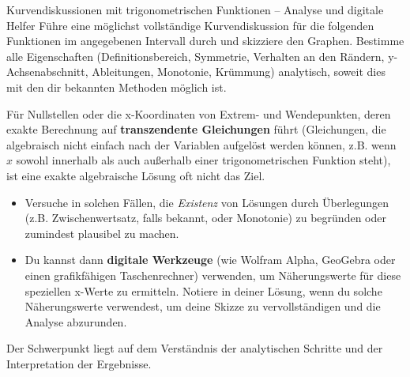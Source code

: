 \begin{aufgabenumgebung}{Kurvendiskussionen mit trigonometrischen Funktionen – Analyse und digitale Helfer}
Führe eine möglichst vollständige Kurvendiskussion für die folgenden Funktionen im angegebenen Intervall durch und skizziere den Graphen. Bestimme alle Eigenschaften (Definitionsbereich, Symmetrie, Verhalten an den Rändern, y-Achsenabschnitt, Ableitungen, Monotonie, Krümmung) analytisch, soweit dies mit den dir bekannten Methoden möglich ist. 

Für Nullstellen oder die x-Koordinaten von Extrem- und Wendepunkten, deren exakte Berechnung auf \textbf{transzendente Gleichungen} führt (Gleichungen, die algebraisch nicht einfach nach der Variablen aufgelöst werden können, z.B. wenn $x$ sowohl innerhalb als auch außerhalb einer trigonometrischen Funktion steht), ist eine exakte algebraische Lösung oft nicht das Ziel.
\begin{itemize}
    \item Versuche in solchen Fällen, die \textit{Existenz} von Lösungen durch Überlegungen (z.B. Zwischenwertsatz, falls bekannt, oder Monotonie) zu begründen oder zumindest plausibel zu machen.
    \item Du kannst dann \textbf{digitale Werkzeuge} (wie Wolfram Alpha, GeoGebra oder einen grafikfähigen Taschenrechner) verwenden, um Näherungswerte für diese speziellen x-Werte zu ermitteln. Notiere in deiner Lösung, wenn du solche Näherungswerte verwendest, um deine Skizze zu vervollständigen und die Analyse abzurunden.
\end{itemize}
Der Schwerpunkt liegt auf dem Verständnis der analytischen Schritte und der Interpretation der Ergebnisse.


\end{aufgabenumgebung}
